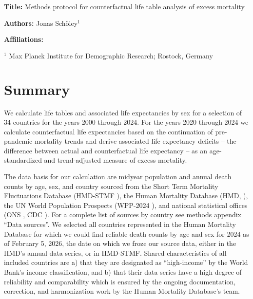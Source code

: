 \documentclass[12pt]{article}
\begin{document}

{\textbf{Title:}
Methods protocol for counterfactual life table analysis of excess mortality
\par\medskip}

{\textbf{Authors:}
Jonas Schöley$^{1}$
\par\medskip}

{\textbf{Affiliations:}\par
$^1$ Max Planck Institute for Demographic Research; Rostock, Germany\par
\par\medskip}

\tableofcontents



\clearpage

\section{Summary}

We calculate life tables and associated life expectancies by sex for a selection of 34 countries for the years 2000 through 2024. For the years 2020 through 2024 we calculate counterfactual life expectancies based on the continuation of pre-pandemic mortality trends and derive associated life expectancy deficits -- the difference between actual and counterfactual life expectancy -- as an age-standardized and trend-adjusted measure of excess mortality.

The data basis for our calculation are midyear population and annual death counts by age, sex, and country sourced from the Short Term Mortality Fluctuations Database (HMD-STMF \cite{jdanov2021b}), the Human Mortality Database (HMD, \cite{HMD2025, Barbieri2015}), the UN World Population Prospects (WPP-2024 \cite{UnitedNationsDepartmentforEconomicandSocialAffairs2025}), and national statistical offices (ONS \cite{officefornationalstatistics2025}, CDC \cite{centersfordiseasecontrolandprevention2025}). For a complete list of sources by country see methods appendix ``Data sources''. We selected all countries represented in the Human Mortality Database for which we could find reliable death counts by age and sex for 2024 as of February 5, 2026, the date on which we froze our source data, either in the HMD's annual data series, or in HMD-STMF. Shared characteristics of all included countries are a) that they are designated as ``high-income'' by the World Bank's income classification, and b) that their data series have a high degree of reliability and comparability which is ensured by the ongoing documentation, correction, and harmonization work by the Human Mortality Database's team.
\end{document}
